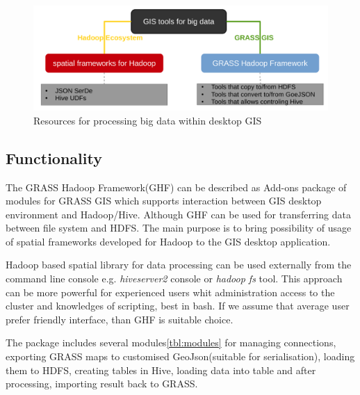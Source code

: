\documentclass[a4paper,12pt,oneside]{report}
\begin{document}
  \begin{figure}[!htbp]
    \centering
    \includegraphics[width=1\textwidth]{./img/idea_schema.pdf}
    \caption[Resources]{\centering Resources for processing big data within desktop GIS}
 \end{figure} 

				
\subsection{Functionality}
The GRASS Hadoop Framework(GHF) can be described as Add-ons package of modules for GRASS GIS which supports interaction between GIS desktop environment and Hadoop/Hive. Although GHF can be used for transferring data between file system and HDFS. The main purpose is to bring possibility of usage of spatial frameworks developed for Hadoop to the GIS desktop application. 

Hadoop based spatial library for data processing can be used externally from the command line console e.g. \textit{hiveserver2} console or \textit{hadoop fs} tool. This approach can be more powerful for experienced users whit administration access to the cluster and knowledges of scripting, best in bash. If we assume that average user prefer friendly interface, than GHF is suitable choice. 

The package includes several modules\ref{tbl:modules} for managing connections, exporting GRASS maps to customised GeoJson(suitable for serialisation), loading them to HDFS, creating tables in Hive, loading data into table and after processing, importing result back to GRASS.
\end{document}
